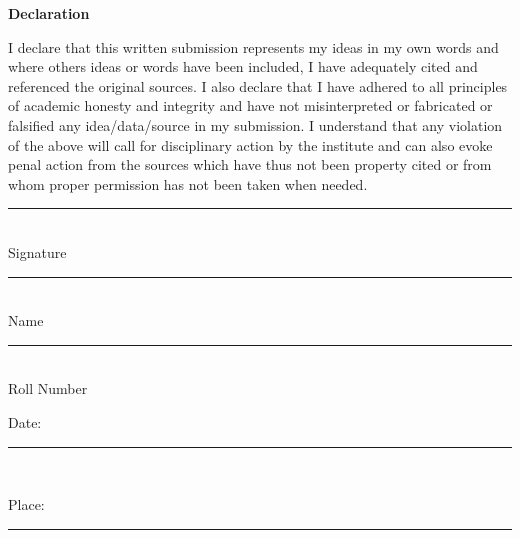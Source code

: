 \documentclass[a4paper,12pt]{report}
\begin{document}
\def\title{Word Sense Induction for Search Result Clustering, Classification }
\def\what{M. Tech. Stage I Report}
\def\degree{Master~of~Technology}
\def\who{Rakesh Dhanireddy}
\def\roll{10305069}
\def\guide{Prof. Ganesh Ramakrishnan, Prof. Saketha Nath}

\titlpage
\def\bsq{\begin{flushright} $\blacksquare$\\ \end{flushright}}
\def\tab{\hspace{5mm}}

 
\newpage

\begin{center}
 \textbf{Declaration}
\end{center}
I declare that this written submission represents my ideas in my own
words and where others ideas or words have been included, I have
adequately cited and referenced the original sources. I also declare
that I have adhered to all principles of academic honesty and
integrity and have not misinterpreted or fabricated or falsified any
idea/data/source in my submission. I understand that any violation of
the above will call for disciplinary action by the institute and can
also evoke penal action from the sources which have thus not been
property cited or from whom proper permission has not been taken when
needed.
   \vspace{1cm}
 \begin{flushright}
 \rule{150pt}{1pt}\\ 
 
 Signature\\
 \vspace{1cm}
 \rule{150pt}{1pt} \\
 
 Name\\
 \vspace{1cm}
 \rule{150pt}{1pt} \\
 
 Roll Number\\
 
 \end{flushright}
 
 \begin{flushleft}
 Date: \rule{150pt}{1pt} \\
 \vspace{1cm}
  
 Place: \rule{150pt}{1pt} \\
 \end{flushleft}
\end{document}
